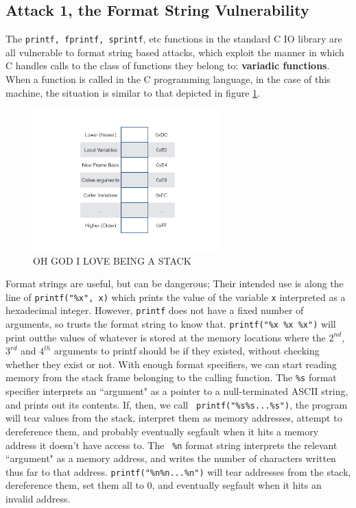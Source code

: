 \subsection{Attack 1, the Format String Vulnerability}

The {\tt printf, fprintf, sprintf}, etc functions in the standard C IO library are all vulnerable to format string based
attacks, which exploit the manner in which C handles calls to the class of functions they belong to: \textbf{variadic
functions}\cite{vfunc}. When a function is called in the C programming language,
in the case of this machine, the situation is similar to that depicted in figure \ref{fig_stack}. 

\begin{figure}[ht] 
	\centering
    \includegraphics[width = 0.65\textwidth]{./images/stack.jpg}
    \caption{OH GOD I LOVE BEING A STACK}     
    \label{fig_stack}
\end{figure}

Format strings are useful, but can be dangerous; Their intended use is along the line of {\tt printf("\%x", x)} which
prints the value of the variable {\tt x} interpreted as a hexadecimal integer. However, {\tt printf} does not have a
fixed number of arguments, so trusts the format string to know that. {\tt printf("\%x \%x \%x")} will print outthe
values of whatever is stored at the memory locations where the $2^{nd}$, $3^{rd}$ and $4^{th}$ arguments to printf
should be if they existed, without checking whether they exist or not. With enough format specifiers, we can start
reading memory from the stack frame belonging to the calling function. The {\tt \%s} format specifier interprets an
``argument" as a pointer to a null-terminated ASCII string, and prints out its contents. If, then, we call {\tt
printf("\%s\%s...\%s")}, the program will tear values from the stack, interpret them as memory addresses, attempt to
dereference them, and probably eventually segfault when it hits a memory address it doesn't have access to. The {\tt
\%n} format string interprets the relevant ``argument" as a memory address, and writes the number of characters written
thus far to that address. {\tt printf("\%n\%n...\%n")} will tear addresses from the stack, dereference them, set them
all to 0, and eventually segfault when it hits an invalid address.

